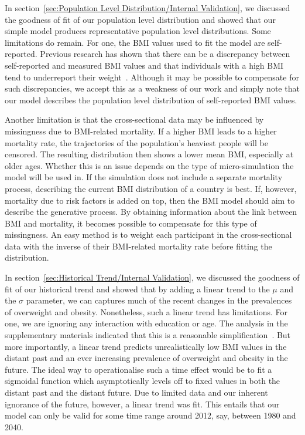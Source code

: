 \documentclass{imammb}
\numberwithin{equation}{section}
\begin{document}
In section~\ref{sec:Population Level Distribution/Internal Validation}, we discussed the goodness of fit of our population level distribution and showed that our simple model produces representative population level distributions. Some limitations do remain. For one, the BMI values used to fit the model are self-reported. Previous research has shown that there can be a discrepancy between self-reported and measured BMI values and that individuals with a high BMI tend to underreport their weight~\citep{Olfert2018}. Although it may be possible to compensate for such discrepancies, we accept this as a weakness of our work and simply note that our model describes the population level distribution of self-reported BMI values.

Another limitation is that the cross-sectional data may be influenced by missingness due to BMI-related mortality. If a higher BMI leads to a higher mortality rate, the trajectories of the population's heaviest people will be censored. The resulting distribution then shows a lower mean BMI, especially at older ages. Whether this is an issue depends on the type of micro-simulation the model will be used in. If the simulation does not include a separate mortality process, describing the current BMI distribution of a country is best. If, however, mortality due to risk factors is added on top, then the BMI model should aim to describe the generative process. By obtaining information about the link between BMI and mortality, it becomes possible to compensate for this type of missingness. An easy method is to weight each participant in the cross-sectional data with the inverse of their BMI-related mortality rate before fitting the distribution.

In section~\ref{sec:Historical Trend/Internal Validation}, we discussed the goodness of fit of our historical trend and showed that by adding a linear trend to the $\mu$ and the $\sigma$ parameter, we can captures much of the recent changes in the prevalences of overweight and obesity. Nonetheless, such a linear trend has limitations. For one, we are ignoring any interaction with education or age. The analysis in the supplementary materials indicated that this is a reasonable simplification~\citep{Bogaardt2023}. But more importantly, a linear trend predicts unrealistically low BMI values in the distant past and an ever increasing prevalence of overweight and obesity in the future. The ideal way to operationalise such a time effect would be to fit a sigmoidal function which asymptotically levels off to fixed values in both the distant past and the distant future. Due to limited data and our inherent ignorance of the future, however, a linear trend was fit. This entails that our model can only be valid for some time range around 2012, say, between 1980 and 2040.
\end{document}
